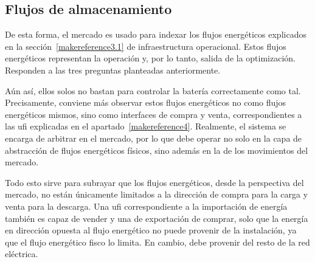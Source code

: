\begin{table}[ht]
  \centering
  \caption[Ajustes del mercado intradiario en cambios de hora de invierno.]{Ajustes del mercado intradiario en cambios de hora de invierno.}
  \label{tab:cambio-hora-invierno}
\end{table}

\subsection{Flujos de almacenamiento}
\label{makereference5.1.2}

De esta forma, el mercado es usado para indexar los flujos energéticos explicados en la sección~\ref{makereference3.1} de infraestructura operacional. Estos flujos energéticos representan la operación y, por lo tanto, salida de la optimización. Responden a las tres preguntas planteadas anteriormente.

Aún así, ellos solos no bastan para controlar la batería correctamente como tal. Precisamente, conviene más observar estos flujos energéticos no como flujos energéticos mismos, sino como interfaces de compra y venta, correspondientes a las \gls{ufi} explicadas en el apartado~\ref{makereference4}. Realmente, el sistema se encarga de arbitrar en el mercado, por lo que debe operar no solo en la capa de abstracción de flujos energéticos físicos, sino además en la de los movimientos del mercado.

Todo esto sirve para subrayar que los flujos energéticos, desde la perspectiva del mercado, no están únicamente limitados a la dirección de compra para la carga y venta para la descarga. Una \gls{ufi} correspondiente a la importación de energía también es capaz de vender y una de exportación de comprar, solo que la energía en dirección opuesta al flujo energético no puede provenir de la instalación, ya que el flujo energético fisco lo limita. En cambio, debe provenir del resto de la red eléctrica.

